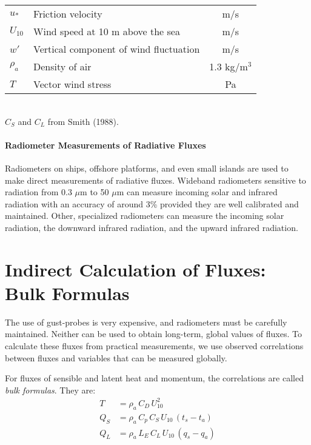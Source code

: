 \begin{table}[t!]
\begin{tabular*}{121mm}{@{}llc@{}}
$u_*$    &  Friction velocity                              & m/s                                      \\
$U_{10}$ &  Wind speed at 10 m above the sea               & m/s                                      \\
$w'$     &  Vertical component of wind fluctuation         & m/s                                      \\
$\rho_a$   &  Density of air                                 & 1.3 kg/m$^{3}$                           \\
$T$      &  Vector wind stress                             &
Pa                                       \\ [0.5ex]
\hline
\end{tabular*} \\ [0.5ex]
$C_S$ and $C_L$ from Smith (1988).
\vspace {-3ex}
\end{table}

\paragraph{Radiometer Measurements of Radiative Fluxes}
Radiometers on ships,
offshore platforms, and even small islands are used to make direct measurements of
radiative fluxes. Wideband radiometers sensitive to radiation from 0.3
$\mu$m to 50 $\mu$m can measure incoming solar and infrared radiation with an
accuracy of around 3\% provided they are well calibrated
and maintained. Other, specialized radiometers can measure the incoming solar radiation, the
downward infrared radiation, and the upward infrared radiation.

\section{Indirect Calculation of Fluxes: Bulk Formulas}
The use of gust-probes is very
expensive, and radiometers must be carefully maintained. Neither can be used to
obtain long-term, global values of fluxes. To calculate these fluxes from practical
measurements, we use observed correlations between fluxes and variables that can
be measured globally.

For fluxes of sensible and latent heat and momentum, the correlations are called \textit{bulk formulas}. They are:
\begin{subequations}
\begin{align}
T     & = \rho_a \,C_D \, U^{2}_{10} \\
Q_S   & = \rho_a \, C_p \,C_S \, U_{10} \, (t_s - t_a) \\
Q_L   & = \rho_a \,  L_E  \, C_L \, U_{10} \,(q_s - q_a)
\end{align}
\end{subequations}

